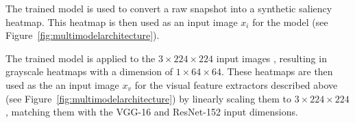 The trained model is used to convert a raw snapshot into a synthetic saliency heatmap. This heatmap is then used as an input image $x_i$ for the \datasetname{} model (see Figure~\ref{fig:multimodelarchitecture}).

The trained model is applied to the $3\times224\times224$ input images , resulting in grayscale heatmaps with a dimension of $1\times64\times64$.
These heatmaps are then used as the an input image $x_{v}$ for the visual feature extractors described above (see Figure~\ref{fig:multimodelarchitecture}) by linearly scaling them to $3\times224\times224$, matching them with the VGG-16 and ResNet-152 input dimensions.
\fi